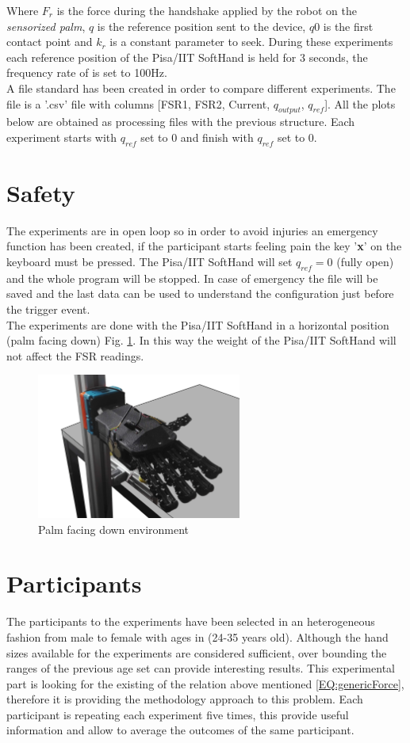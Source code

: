 Where $F_r$ is the force during the handshake applied by the robot on the \textit{sensorized palm}, $q$ is the reference position sent to the device, $q0$ is the first contact point and $k_{r}$ is a constant parameter to seek.
During these experiments each reference position of the Pisa/IIT SoftHand is held for 3 seconds, the frequency rate of is set to 100Hz. \\
A file standard has been created in order to compare different experiments. The file is a '.csv' file with columns [FSR1, FSR2, Current, $q_{output}$, $q_{ref}$]. All the plots below are obtained as processing files with the previous structure. Each experiment starts with $q_{ref}$ set to 0 and finish with $q_{ref}$ set to 0. \\
\section{Safety}\label{sec:safety}
The experiments are in open loop so in order to avoid injuries an emergency function has been created, if the participant starts feeling pain the key '\textbf{x}' on the keyboard must be pressed. The Pisa/IIT SoftHand will set $q_{ref}=0$ (fully open) and the whole program will be stopped.
In case of emergency the file will be saved and the last data can be used to understand the configuration just before the trigger event.\\
The experiments are done with the Pisa/IIT SoftHand in a horizontal position (palm facing down) Fig. \ref{Fig:palmdown}. In this way the weight of the Pisa/IIT SoftHand will not affect the FSR readings. 

\begin{figure}[ht]
\centering
\includegraphics[width=0.6\textwidth]{Figure/stand.png}
\caption{Palm facing down environment}
\label{Fig:palmdown}
\end{figure}

\section*{Participants}\label{sec:participants}
The participants to the experiments have been selected in an heterogeneous fashion from male to female with ages in (24-35 years old). Although the hand sizes available for the experiments are considered sufficient, over bounding the ranges of the previous age set can provide interesting results.
This experimental part is looking for the existing of the relation above mentioned \ref{EQ:genericForce}, therefore it is providing the methodology approach to this problem.
Each participant is repeating each experiment five times, this provide useful information and allow to average the outcomes of the same participant.

